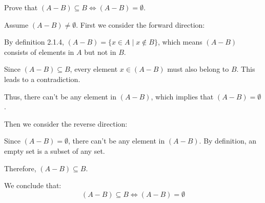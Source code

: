 \documentclass{article}
\begin{document}
Prove that $(A - B) \subseteq B \iff (A - B) = \emptyset$.

Assume $(A-B) \neq \emptyset$. First we consider the forward direction:

By definition 2.1.4, $(A-B)=\{x\in A \mid x\not\in B\}$, which means $(A-B)$ consists of elements in $A$ but not in $B$.

Since $(A-B) \subseteq B$, every element $x \in (A-B)$ must also belong to $B$. 
This leads to a contradiction.

Thus, there can't be any element in $(A-B)$, which implies that $(A-B) = \emptyset$.

Then we consider the reverse direction:

Since $(A-B) = \emptyset$, there can't be any element in $(A-B)$. 
By definition, an empty set is a subset of any set.

Therefore, $(A-B) \subseteq B$.

We conclude that: \[(A - B) \subseteq B \iff (A - B) = \emptyset\]
\end{document}
